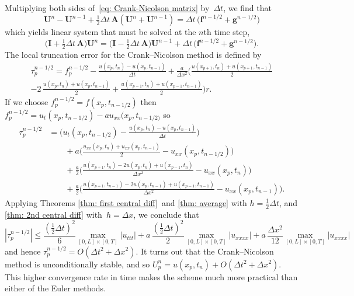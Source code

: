 Multiplying both sides of~\eqref{eq: Crank-Nicolson matrix} by~$\Delta t$, we 
find that
\[
\boldsymbol{U}^n-\boldsymbol{U}^{n-1}
    +\tfrac12\Delta t\,\boldsymbol{A}(\boldsymbol{U}^n+\boldsymbol{U}^{n-1})
    =\Delta t\,\bigl(\boldsymbol{f}^{n-1/2}+\boldsymbol{g}^{n-1/2}\bigr)
\]
which yields linear system that must be solved at the $n$th time step,
\[
\bigl(\boldsymbol{I}+\tfrac12\Delta t\,\boldsymbol{A}\bigr)\boldsymbol{U}^n=
\bigl(\boldsymbol{I}-\tfrac12\Delta t\,\boldsymbol{A}\bigr)\boldsymbol{U}^{n-1}
    +\Delta t\,\bigl(\boldsymbol{f}^{n-1/2}+\boldsymbol{g}^{n-1/2}\bigr).
\]
The local truncation error for the Crank--Nicolson method is defined by
\begin{multline*}
\tau^{n-1/2}_p=f^{n-1/2}_p-\frac{u(x_p,t_n)-u(x_p,t_{n-1})}{\Delta t}
    +\frac{a}{\Delta x^2}\biggl(
    \frac{u(x_{p+1},t_n)+u(x_{p+1},t_{n-1})}{2}\\
    -2\,\frac{u(x_p,t_n)+u(x_p,t_{n-1})}{2}
    +\frac{u(x_{p-1},t_n)+u(x_{p-1},t_{n-1})}{2}\biggr)r.
\end{multline*}
If we choose $f^{n-1/2}_p=f(x_p,t_{n-1/2})$ then
$f^{n-1/2}_p=u_t(x_p,t_{n-1/2})-au_{xx}(x_p,t_{n-1/2)}$ so
\begin{align*}
\tau^{n-1/2}_p
&=\biggl(u_t(x_p,t_{n-1/2})-\frac{u(x_p,t_n)-u(x_p,t_{n-1})}{\Delta t}\biggr)\\
    &\qquad{}+a\biggl(\frac{u_{xx}(x_p,t_n)+u_{xx}(x_p,t_{n-1})}{2}
        -u_{xx}(x_p,t_{n-1/2})\biggr)\\
    &\qquad{}+\frac{a}{2}\biggl(
    \frac{u(x_{p+1},t_n)-2u(x_p,t_n)+u(x_{p-1},t_n)}{\Delta x^2}-u_{xx}(x_p,t_n)
    \biggr)\\
    &\qquad{}+\frac{a}{2}\biggl(
    \frac{u(x_{p+1},t_{n-1})-2u(x_p,t_{n-1})+u(x_{p-1},t_{n-1})}{\Delta x^2}
        -u_{xx}(x_p,t_{n-1})\biggr).
\end{align*}
Applying Theorems \ref{thm: first central diff}~and \ref{thm: average} with 
$h=\tfrac12\Delta t$, and \cref{thm: 2nd central diff} with~$h=\Delta 
x$, we conclude that
\[
|\tau^{n-1/2}_p|
    \le\frac{(\tfrac12\Delta t)^2}{6}\max_{[0,L]\times[0,T]}|u_{ttt}| 
    +a\,\frac{(\tfrac12\Delta t)^2}{2}\max_{[0,L]\times[0,T]}|u_{xxxx}|
    +a\,\frac{\Delta x^2}{12}\max_{[0,L]\times[0,T]}|u_{xxxx}|
\]
and hence $\tau^{n-1/2}_p=O(\Delta t^2+\Delta x^2)$.  It turns out that the 
Crank--Nicolson method is unconditionally stable, and so 
$U^n_p=u(x_p,t_n)+O(\Delta t^2+\Delta x^2)$.  This higher convergence rate in 
time makes the scheme much more practical than either of the Euler methods.

